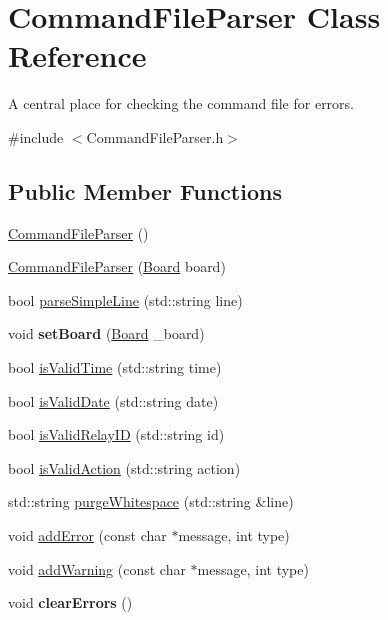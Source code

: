 \hypertarget{classCommandFileParser}{
\section{CommandFileParser Class Reference}
\label{classCommandFileParser}
}


A central place for checking the command file for errors.  




{\ttfamily \#include $<$CommandFileParser.h$>$}

\subsection*{Public Member Functions}
\begin{DoxyCompactItemize}
\item 
\hyperlink{classCommandFileParser_aa24d02c473d9d3d01294f21358803298}{CommandFileParser} ()
\item 
\hyperlink{classCommandFileParser_a49b17ddf6521173d2e509cf9b01fe804}{CommandFileParser} (\hyperlink{classBoard}{Board} board)
\item 
bool \hyperlink{classCommandFileParser_a289cd79998c789e821349ae75a51e3b0}{parseSimpleLine} (std::string line)
\item 
\hypertarget{classCommandFileParser_a71fd840d693859f1ef4d72cd3af3c3dd}{
void {\bfseries setBoard} (\hyperlink{classBoard}{Board} \_\-board)}
\label{classCommandFileParser_a71fd840d693859f1ef4d72cd3af3c3dd}

\item 
bool \hyperlink{classCommandFileParser_ae4328cd139c99cbe1c985cacc86164d4}{isValidTime} (std::string time)
\item 
bool \hyperlink{classCommandFileParser_ae784b8bb47f68026ad28a77834ddeb4e}{isValidDate} (std::string date)
\item 
bool \hyperlink{classCommandFileParser_a571f105fedb8fb54270d2f88a6a45dfb}{isValidRelayID} (std::string id)
\item 
bool \hyperlink{classCommandFileParser_a58da750f1de1b279c1acdb2ae84b1554}{isValidAction} (std::string action)
\item 
std::string \hyperlink{classCommandFileParser_a5a7cf1aab6e18b15d1db4447b7d53ce4}{purgeWhitespace} (std::string \&line)
\item 
void \hyperlink{classCommandFileParser_ab86b5967059afc2da9f2afb68ff49c11}{addError} (const char $\ast$message, int type)
\item 
void \hyperlink{classCommandFileParser_ac3305230e99692571f579548b5cab1dc}{addWarning} (const char $\ast$message, int type)
\item 
\hypertarget{classCommandFileParser_a4ddcf92c995981dcb8f52c4f4f626265}{
void {\bfseries clearErrors} ()}
\label{classCommandFileParser_a4ddcf92c995981dcb8f52c4f4f626265}


\end{DoxyCompactItemize}
